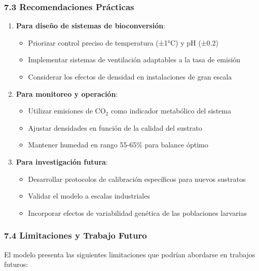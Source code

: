 \documentclass[
]{article}
\providecommand{\tightlist}{%
  \setlength{\itemsep}{0pt}\setlength{\parskip}{0pt}}
\begin{document}
\subsubsection{7.3 Recomendaciones
Prácticas}\label{recomendaciones-pruxe1cticas}

\begin{enumerate}
\def\labelenumi{\arabic{enumi}.}
\tightlist
\item
  \textbf{Para diseño de sistemas de bioconversión}:

  \begin{itemize}
  \tightlist
  \item
    Priorizar control preciso de temperatura (±1°C) y pH (±0.2)
  \item
    Implementar sistemas de ventilación adaptables a la tasa de emisión
  \item
    Considerar los efectos de densidad en instalaciones de gran escala
  \end{itemize}
\item
  \textbf{Para monitoreo y operación}:

  \begin{itemize}
  \tightlist
  \item
    Utilizar emisiones de CO$_2$ como indicador metabólico del sistema
  \item
    Ajustar densidades en función de la calidad del sustrato
  \item
    Mantener humedad en rango 55-65\% para balance óptimo
  \end{itemize}
\item
  \textbf{Para investigación futura}:

  \begin{itemize}
  \tightlist
  \item
    Desarrollar protocolos de calibración específicos para nuevos
    sustratos
  \item
    Validar el modelo a escalas industriales
  \item
    Incorporar efectos de variabilidad genética de las poblaciones
    larvarias
  \end{itemize}
\end{enumerate}

\subsubsection{7.4 Limitaciones y Trabajo
Futuro}\label{limitaciones-y-trabajo-futuro}

El modelo presenta las siguientes limitaciones que podrían abordarse en
trabajos futuros:
\end{document}
